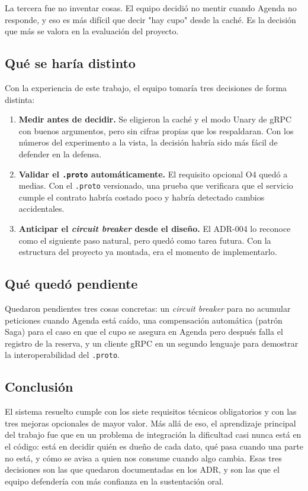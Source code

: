 \documentclass[12pt, a4paper]{article}
\begin{document}
La tercera fue no inventar cosas. El equipo decidió no mentir cuando
Agenda no responde, y eso es más difícil que decir "hay cupo" desde la
caché. Es la decisión que más se valora en la evaluación del proyecto.

\subsection{Qué se haría distinto}

Con la experiencia de este trabajo, el equipo tomaría tres decisiones de
forma distinta:

\begin{enumerate}[leftmargin=1.7cm]
    \item \textbf{Medir antes de decidir.} Se eligieron la caché y el
    modo Unary de gRPC con buenos argumentos, pero sin cifras propias que
    los respaldaran. Con los números del experimento a la vista, la
    decisión habría sido más fácil de defender en la defensa.
    \item \textbf{Validar el \texttt{.proto} automáticamente.} El
    requisito opcional O4 quedó a medias. Con el \texttt{.proto}
    versionado, una prueba que verificara que el servicio cumple el
    contrato habría costado poco y habría detectado cambios accidentales.
    \item \textbf{Anticipar el \emph{circuit breaker} desde el diseño.} El
    ADR-004 lo reconoce como el siguiente paso natural, pero quedó como
    tarea futura. Con la estructura del proyecto ya montada, era el
    momento de implementarlo.
\end{enumerate}

\subsection{Qué quedó pendiente}

Quedaron pendientes tres cosas concretas: un \emph{circuit breaker} para
no acumular peticiones cuando Agenda está caído, una compensación
automática (patrón Saga) para el caso en que el cupo se asegura en Agenda pero
después falla el registro de la reserva, y un cliente gRPC en un segundo
lenguaje para demostrar la interoperabilidad del \texttt{.proto}.

\subsection{Conclusión}

El sistema resuelto cumple con los siete requisitos técnicos obligatorios
y con las tres mejoras opcionales de mayor valor. Más allá de eso, el
aprendizaje principal del trabajo fue que en un problema de integración
la dificultad casi nunca está en el código: está en decidir quién es
dueño de cada dato, qué pasa cuando una parte no está, y cómo se avisa a
quien nos consume cuando algo cambia. Esas tres decisiones son las que
quedaron documentadas en los ADR, y son las que el equipo defendería con
más confianza en la sustentación oral.
\end{document}
